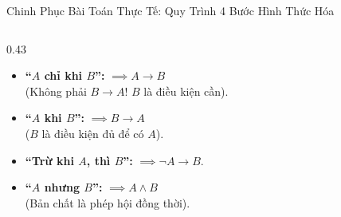 \documentclass[aspectratio=169, 10pt]{beamer}
\begin{document}
\begin{frame}{Chinh Phục Bài Toán Thực Tế: Quy Trình 4 Bước Hình Thức Hóa}
\begin{columns}[t, onlytextwidth]
\begin{column}{0.43\textwidth}
\begin{cozyTrap}
        \small
        \begin{itemize}
          \setlength{\itemsep}{0.8pt}
          \item \textbf{``$A$ chỉ khi $B$'':} $\implies A \to B$\\
          {\footnotesize\color{cozySlate!80!black}(Không phải $B \to A$! $B$ là điều kiện cần).}
          \item \textbf{``$A$ khi $B$'':} $\implies B \to A$\\
          {\footnotesize\color{cozySlate!80!black}($B$ là điều kiện đủ để có $A$)}.
          \item \textbf{``Trừ khi $A$, thì $B$'':} $\implies \neg A \to B$.
          \item \textbf{``$A$ nhưng $B$'':} $\implies A \land B$\\
          {\footnotesize\color{cozySlate!80!black}(Bản chất là phép hội đồng thời)}.
        \end{itemize}
      \end{cozyTrap}
    \end{column}
  \end{columns}
\end{frame}
\end{document}
